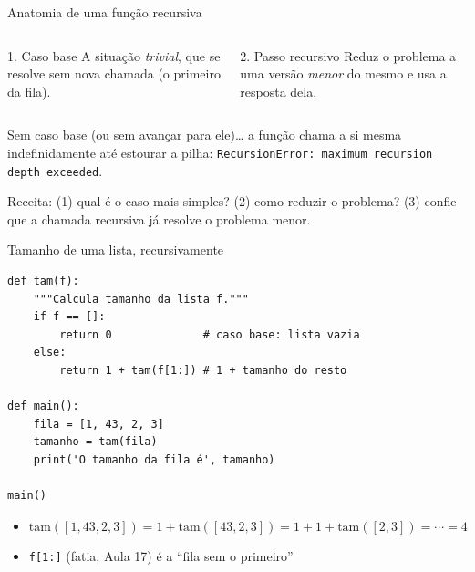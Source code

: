 \documentclass[aspectratio=169,10pt,t]{beamer}
\begin{document}
\begin{frame}{Anatomia de uma função recursiva}
  \begin{columns}[T]
    \begin{block}{1. Caso base}
      A situação \emph{trivial}, que se resolve sem nova chamada (o primeiro da fila).
    \end{block}
    \begin{block}{2. Passo recursivo}
      Reduz o problema a uma versão \emph{menor} do mesmo e usa a resposta dela.
    \end{block}
  \end{columns}
  \vspace{1ex}
  \begin{alertblock}{Sem caso base (ou sem avançar para ele)\ldots}
    a função chama a si mesma indefinidamente até estourar a pilha: \texttt{RecursionError: maximum recursion depth exceeded}.
  \end{alertblock}
  \small Receita: (1) qual é o caso mais simples? (2) como reduzir o problema? (3) confie que a chamada recursiva já resolve o problema menor.
\end{frame}

\begin{frame}[fragile]{Tamanho de uma lista, recursivamente}
\begin{lstlisting}[basicstyle=\ttfamily\scriptsize]
def tam(f):
    """Calcula tamanho da lista f."""
    if f == []:
        return 0              # caso base: lista vazia
    else:
        return 1 + tam(f[1:]) # 1 + tamanho do resto

def main():
    fila = [1, 43, 2, 3]
    tamanho = tam(fila)
    print('O tamanho da fila é', tamanho)

main()
\end{lstlisting}
  \begin{itemize}
    \item \(\text{tam}([1,43,2,3]) = 1 + \text{tam}([43,2,3]) = 1+1+\text{tam}([2,3]) = \cdots = 4\)
    \item \texttt{f[1:]} (fatia, Aula 17) é a ``fila sem o primeiro''
  \end{itemize}
\end{frame}
\end{document}
